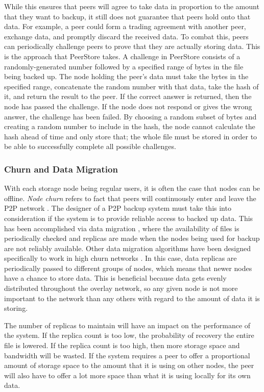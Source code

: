 \documentclass[a4paper]{article}
\begin{document}
While this ensures that peers will agree to take data in proportion to the amount that they want to backup, it still does not guarantee that peers hold onto that data. For example, a peer could form a trading agreement with another peer, exchange data, and promptly discard the received data. To combat this, peers can periodically challenge peers to prove that they are actually storing data. This is the approach that PeerStore takes. A challenge in PeerStore consists of a randomly-generated number followed by a specified range of bytes in the file being backed up. The node holding the peer's data must take the bytes in the specified range, concatenate the random number with that data, take the hash of it, and return the result to the peer. If the correct answer is returned, then the node has passed the challenge. If the node does not respond or gives the wrong answer, the challenge has been failed. By choosing a random subset of bytes and creating a random number to include in the hash, the node cannot calculate the hash ahead of time and only store that; the whole file must be stored in order to be able to successfully complete all possible challenges.

\subsubsection{Churn and Data Migration}
With each storage node being regular users, it is often the case that nodes can be offline. \textit{Node churn} refers to fact that peers will continuously enter and leave the P2P network \cite{StorageSearchP2PNetworks}. The designer of a P2P backup system must take this into consideration if the system is to provide reliable access to backed up data. This has been accomplished via data migration \cite{pStore,PeerStore}, where the availability of files is periodically checked and replicas are made when the nodes being used for backup are not reliably available. Other data migration algorithms have been designed specifically to work in high churn networks \cite{StorageSearchP2PNetworks}. In this case, data replicas are periodically passed to different groups of nodes, which means that newer nodes have a chance to store data. This is beneficial because data gets evenly distributed throughout the overlay network, so any given node is not more important to the network than any others with regard to the amount of data it is storing.

The number of replicas to maintain will have an impact on the performance of the system. If the replica count is too low, the probability of recovery the entire file is lowered. If the replica count is too high, then more storage space and bandwidth will be wasted. If the system requires a peer to offer a proportional amount of storage space to the amount that it is using on other nodes, the peer will also have to offer a lot more space than what it is using locally for its own data.
\end{document}
